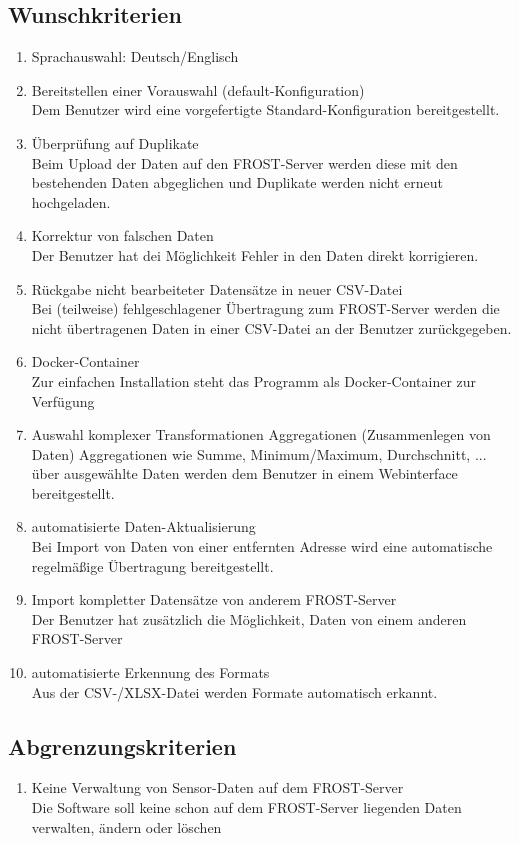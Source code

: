 \documentclass[12 pt]{article}
\begin{document}
\subsection{Wunschkriterien}
\begin{enumerate}
\item Sprachauswahl: Deutsch/Englisch
\item Bereitstellen einer Vorauswahl (default-Konfiguration) \\
	Dem Benutzer wird eine vorgefertigte Standard-Konfiguration bereitgestellt.
\item Überprüfung auf Duplikate \\
	Beim Upload der Daten auf den FROST-Server werden diese mit den bestehenden Daten abgeglichen und Duplikate werden nicht erneut hochgeladen.
\item Korrektur von falschen Daten \\
	Der Benutzer hat dei Möglichkeit Fehler in den Daten direkt korrigieren.
\item Rückgabe nicht bearbeiteter Datensätze in neuer CSV-Datei \\
	Bei (teilweise) fehlgeschlagener Übertragung zum FROST-Server werden die nicht übertragenen Daten in einer CSV-Datei an der Benutzer zurückgegeben.
\item Docker-Container \\
	Zur einfachen Installation steht das Programm als Docker-Container zur Verfügung
\item Auswahl komplexer Transformationen Aggregationen (Zusammenlegen von Daten)
	Aggregationen wie Summe, Minimum/Maximum, Durchschnitt, ... über ausgewählte Daten werden dem Benutzer in einem Webinterface bereitgestellt.
\item automatisierte Daten-Aktualisierung \\
	Bei Import von Daten von einer entfernten Adresse wird eine automatische regelmäßige Übertragung bereitgestellt.
\item Import kompletter Datensätze von anderem FROST-Server \\
	Der Benutzer hat zusätzlich die Möglichkeit, Daten von einem anderen FROST-Server 
\item automatisierte Erkennung des Formats \\
	Aus der CSV-/XLSX-Datei werden Formate automatisch erkannt.


\end{enumerate}

\subsection{Abgrenzungskriterien}
\begin{enumerate}
\item Keine Verwaltung von Sensor-Daten auf dem FROST-Server \\
	Die Software soll keine schon auf dem FROST-Server liegenden Daten verwalten, ändern oder löschen
\end{enumerate}
\end{document}
